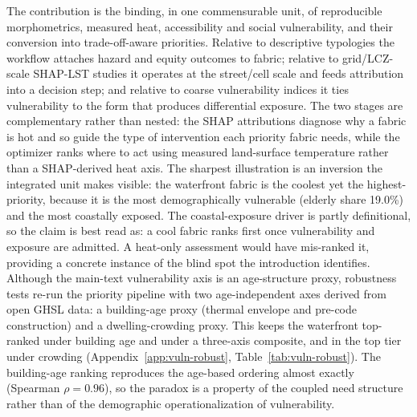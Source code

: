 \label{sec:disc-positioning}
The contribution is the binding, in one commensurable unit, of reproducible
morphometrics, measured heat, accessibility and social vulnerability, and their
conversion into trade-off-aware priorities. Relative to descriptive typologies
\citep{araldi2025MultiLevel, fleischmann2022MethodolFoundati} the workflow attaches
hazard and equity outcomes to fabric; relative to grid/LCZ-scale SHAP-LST studies
\citep{wangZ2025PlainPlateau, li2026BlockGrid} it operates at the street/cell scale
and feeds attribution into a decision step; and relative to coarse vulnerability
indices \citep{turner2025Guhvi} it ties vulnerability to the form that produces
differential exposure. The two stages are complementary rather than nested: the SHAP attributions diagnose
why a fabric is hot and so guide the type of intervention each priority
fabric needs, while the optimizer ranks where to act using measured
land-surface temperature rather than a SHAP-derived heat axis. The sharpest
illustration is an inversion the integrated unit makes visible: the waterfront
fabric is the coolest yet the highest-priority, because it is the most
demographically vulnerable (elderly share 19.0\%) and the most coastally exposed.
The coastal-exposure driver is partly definitional, so the claim is best read as:
a cool fabric ranks first once vulnerability and exposure are
admitted. A heat-only assessment would have mis-ranked it, providing a concrete instance of
the blind spot the introduction identifies. Although the main-text vulnerability
axis is an age-structure proxy, robustness tests re-run the priority pipeline with
two age-independent axes derived from open GHSL data: a building-age proxy
(thermal envelope and pre-code construction) and a dwelling-crowding proxy. This
keeps the waterfront top-ranked under building age and under a three-axis
composite, and in the top tier under crowding (Appendix~\ref{app:vuln-robust},
Table~\ref{tab:vuln-robust}). The building-age ranking reproduces the age-based ordering
almost exactly (Spearman $\rho = 0.96$), so the paradox is a property of the coupled
need structure rather than of the demographic operationalization of vulnerability.


